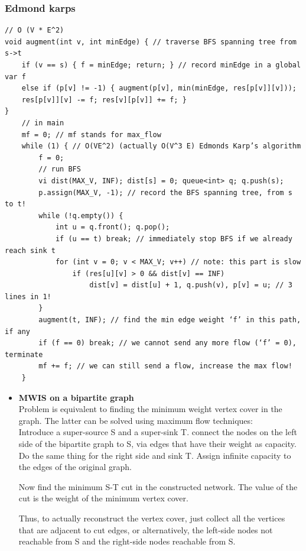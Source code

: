 \documentclass[8pt, a4paper, oneside, twocolumn]{extarticle}
\begin{document}
\subsubsection{Edmond karps}
\begin{verbatim}
// O (V * E^2)
void augment(int v, int minEdge) { // traverse BFS spanning tree from s->t
    if (v == s) { f = minEdge; return; } // record minEdge in a global var f
    else if (p[v] != -1) { augment(p[v], min(minEdge, res[p[v]][v]));
    res[p[v]][v] -= f; res[v][p[v]] += f; }
}
    // in main
    mf = 0; // mf stands for max_flow
    while (1) { // O(VE^2) (actually O(V^3 E) Edmonds Karp’s algorithm
        f = 0;
        // run BFS
        vi dist(MAX_V, INF); dist[s] = 0; queue<int> q; q.push(s);
        p.assign(MAX_V, -1); // record the BFS spanning tree, from s to t!
        while (!q.empty()) {
            int u = q.front(); q.pop();
            if (u == t) break; // immediately stop BFS if we already reach sink t
            for (int v = 0; v < MAX_V; v++) // note: this part is slow
                if (res[u][v] > 0 && dist[v] == INF)
                    dist[v] = dist[u] + 1, q.push(v), p[v] = u; // 3 lines in 1!
        }
        augment(t, INF); // find the min edge weight ‘f’ in this path, if any
        if (f == 0) break; // we cannot send any more flow (‘f’ = 0), terminate
        mf += f; // we can still send a flow, increase the max flow!
    }
\end{verbatim}
\begin{itemize}
    \item \textbf{MWIS on a bipartite graph}
    \\Problem is equivalent to finding the minimum weight vertex cover in the graph. The latter can be solved using maximum flow techniques:
    \\Introduce a super-source S and a super-sink T. connect the nodes on the left side of the bipartite graph to S, via edges that have their weight as capacity. Do the same thing for the right side and sink T. Assign infinite capacity to the edges of the original graph.

    Now find the minimum S-T cut in the constructed network. The value of the cut is the weight of the minimum vertex cover. 

    Thus, to actually reconstruct the vertex cover, just collect all the vertices that are adjacent to cut edges, or alternatively, the left-side nodes not reachable from S and the right-side nodes reachable from S.
\end{itemize}
\end{document}
